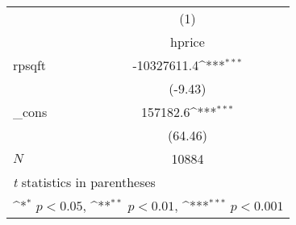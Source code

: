 {
\def\sym#1{\ifmmode^{#1}\else\(^{#1}\)\fi}
\begin{tabular}{l*{1}{c}}
\hline\hline
            &\multicolumn{1}{c}{(1)}\\
            &\multicolumn{1}{c}{hprice}\\
\hline
rpsqft      & -10327611.4\sym{***}\\
            &     (-9.43)         \\
[1em]
\_cons      &    157182.6\sym{***}\\
            &     (64.46)         \\
\hline
\(N\)       &       10884         \\
\hline\hline
\multicolumn{2}{l}{\footnotesize \textit{t} statistics in parentheses}\\
\multicolumn{2}{l}{\footnotesize \sym{*} \(p<0.05\), \sym{**} \(p<0.01\), \sym{***} \(p<0.001\)}\\
\end{tabular}
}
